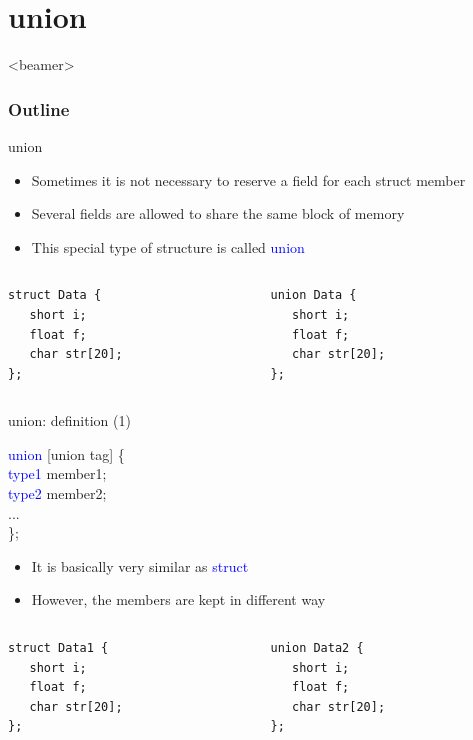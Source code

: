 \section{union}
\label{sec:union}
\begin{frame}<beamer>
    \frametitle{Outline}
    \tableofcontents[currentsection]
\end{frame}

\begin{frame}[fragile]{union}
\begin{itemize}
	\item {Sometimes it is not necessary to reserve a field for each struct member}
	\item {Several fields are allowed to share the same block of memory}
	\item {This special type of structure is called \textcolor{blue}{union}}
\end{itemize}
\begin{columns}
\begin{column}{0.45\linewidth}
\begin{lstlisting}
struct Data {
   short i;
   float f;
   char str[20];
};
\end{lstlisting}
\end{column}
\begin{column}{0.45\linewidth}
\begin{lstlisting}
union Data {
   short i;
   float f;
   char str[20];
};
\end{lstlisting}
\end{column}
\end{columns}
\end{frame}

\begin{frame}[fragile]{union: definition (1)}
\begin{center}
	\Large{
   \textcolor{blue}{union} [union tag] \{ \\
   \textcolor{blue}{type1} member1; \\
   \textcolor{blue}{type2} member2; \\
   ... \\
   \};
	}
\end{center}
\begin{itemize}
	\item {It is basically very similar as \textcolor{blue}{struct}}
	\item {However, the members are kept in different way}
\end{itemize}
\begin{columns}
\begin{column}{0.45\linewidth}
\begin{lstlisting}
struct Data1 {
   short i;
   float f;
   char str[20];
};
\end{lstlisting}
\end{column}
\begin{column}{0.45\linewidth}
\begin{lstlisting}
union Data2 {
   short i;
   float f;
   char str[20];
};
\end{lstlisting}
\end{column}
\end{columns}
\end{frame}

